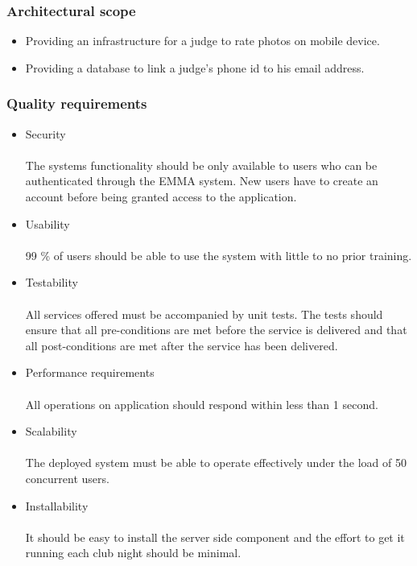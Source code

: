 \documentclass[10pt,a4paper]{article}
\begin{document}
\subsubsection{Architectural scope}
\begin{itemize}
\item Providing an infrastructure for a judge to rate photos on mobile device.
\item Providing a database to link a judge's phone id to his email address.
\end{itemize}
\subsubsection{Quality requirements}
\begin{itemize}
\item Security
\paragraph{}
The systems functionality should be only available to users who can be authenticated through the EMMA system. New users have to create an account before being granted access to the application.
\item Usability
\paragraph{}
99 \% of users should be able to use the system with little to no prior training.
\item Testability
\paragraph{}
All services offered must be accompanied by unit tests. The tests should ensure that all pre-conditions are met before the service is delivered and that all post-conditions are met after the service has been delivered.
\item Performance requirements
\paragraph{}
 All operations on application should respond within less than 1 second.
\item Scalability
\paragraph{}
The deployed system must be able to operate effectively under the load of 50 concurrent users.
\item Installability
\paragraph{}
It should be easy to install the server side component and the effort to get it running each club night should be minimal.
\end{itemize}
\end{document}
